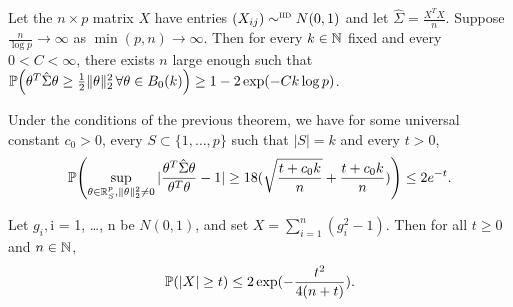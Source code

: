 \begin{thm}
  Let the $n \times p$ matrix $X$ have entries $(X_{ij}) \sim^{\textsc{iid}}
  N(0, 1)$  and let $\hat \Sigma = \frac{X^{T} X}{n}$.  Suppose
  $\frac{n}{\log p}  \rightarrow \infty$ as $\min(p, n) \rightarrow
  \infty$.  Then for every $k \in \mathbb{N}$ fixed and every $0 < C <
  \infty$, there exists $n$ large enough such that $\Prob{\theta^{T}
    \hat \Sigma \theta \geq \frac{1}{2} \| \theta \|_{2}^{2}\, \forall
  \theta \in B_{0}(k)} \geq 1 - 2 \exp(-Ck \log p)$.
\end{thm}

\begin{thm}
  Under the conditions of the previous theorem, we have for some
  universal constant $c_{0} > 0$, every $S \subset \{ 1, \dots, p \}$
  such that $|S| = k$ and every $t > 0$,
  \begin{equation}
    \label{eq:39}
    \Prob{\sup_{\theta \in \R^{p}_{S}, \| \theta \|_{2}^{2} \neq 0} |
      \frac{\theta^{T} \hat \Sigma \theta}{\theta^{T} \theta}  - 1 |
      \geq 18 (\sqrt{\frac{t + c_{0} k}{n}} + \frac{t + c_{0} k}{n} )
    } \leq 2 e^{-t}.
  \end{equation}
\end{thm}

\begin{thm}
  Let $g_{i}, $i = 1, \dots, n be \iid $N(0, 1)$, and set $X =
  \sum_{i=1}^{n} (g_{i}^{2} - 1)$.  Then for all $t \geq 0$ and $n \in
  \mathbb{N}$,
  \begin{equation}
    \label{eq:40}
    \Prob{|X| \geq t} \leq 2 \exp(-\frac{t^{2}}{4(n+t)}).
  \end{equation}
\end{thm}




